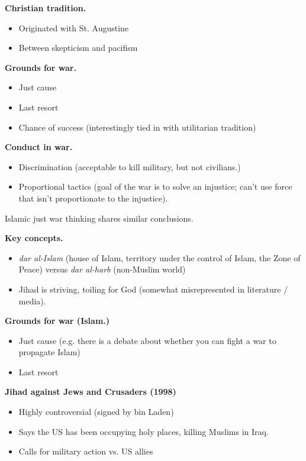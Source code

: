 \documentclass{article}
\begin{document}
{\bf Christian tradition.}

\begin{itemize}
  \item Originated with St. Augustine
  \item Between skepticism and pacifism
\end{itemize}

{\bf Grounds for war.}

\begin{itemize}
  \item Just cause
  \item Last resort
  \item Chance of success (interestingly tied in with utilitarian tradition)
\end{itemize}

{\bf Conduct in war.}

\begin{itemize}
  \item Discrimination (acceptable to kill military, but not civilians.)
  \item Proportional tactics (goal of the war is to solve an injustice; can't use force that isn't proportionate to the injustice).
\end{itemize}

Islamic just war thinking shares similar conclusions.

{\bf Key concepts.}

\begin{itemize}
  \item {\it dar al-Islam} (house of Islam, territory under the control of Islam, the Zone of Peace) versus {\it dar al-harb} (non-Muslim world)
  \item Jihad is striving, toiling for God (somewhat misrepresented in literature / media).
\end{itemize}

{\bf Grounds for war (Islam.)}

\begin{itemize}
  \item Just cause (e.g. there is a debate about whether you can fight a war to propagate Islam)
  \item Last resort 
\end{itemize}

{\bf Jihad against Jews and Crusaders (1998)}

\begin{itemize}
  \item Highly controversial (signed by bin Laden)
  \item Says the US has been occupying holy places, killing Muslims in Iraq.
  \item Calls for military action vs. US allies
\end{itemize}
\end{document}
